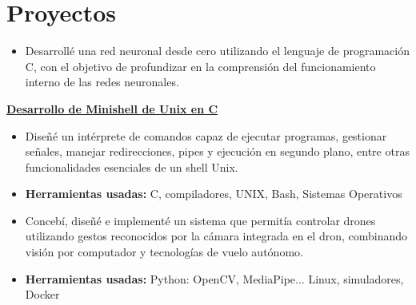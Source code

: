 \documentclass[letterpaper]{cv} %
\begin{document}
\section{Proyectos}
\textbf{\underline{}}
{\begin{itemize}
        \item Desarrollé una red neuronal desde cero utilizando el lenguaje de programación C, con el objetivo de profundizar en la comprensión del funcionamiento interno de las redes neuronales.
\end{itemize}}
\textbf{\underline{Desarrollo de Minishell de Unix en C}}
{\begin{itemize}
        \item Diseñé un intérprete de comandos capaz de ejecutar programas, gestionar señales, manejar redirecciones, pipes y ejecución en segundo plano, entre otras funcionalidades esenciales de un shell Unix.
        \item \textbf{Herramientas usadas:} C, compiladores, UNIX, Bash, Sistemas Operativos
\end{itemize}}
\textbf{\underline{}}
{\begin{itemize}
        \item Concebí, diseñé e implementé un sistema que permitía controlar drones utilizando gestos reconocidos por la cámara integrada en el dron, combinando visión por computador y tecnologías de vuelo autónomo.
        \item \textbf{Herramientas usadas:} Python: OpenCV, MediaPipe... Linux, simuladores, Docker
\end{itemize}}
\end{document}
